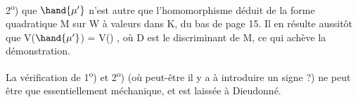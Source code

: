 2\textsuperscript{o}) que $\hand{\mu'}$ n'est autre que l'homomorphisme déduit de la forme
quadratique  M sur W à valeurs dans K, du bas de page 15. Il en résulte
aussitôt que V($\hand{\mu'}$) = V() , où D est le discriminant de M, ce  qui
achève la démonstration.

La vérification de 1\textsuperscript{o}) et 2\textsuperscript{o}) (où peut-être il y a à introduire un
signe ?) ne peut être que essentiellement méchanique, et est laissée à
Dieudonné.

